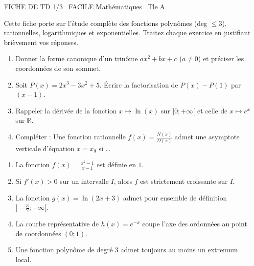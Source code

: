 \documentclass[11pt]{article}
\begin{document}
\begin{tcolorbox}[enhanced,colback=popink,colframe=popink,arc=10pt,boxrule=0pt,left=12pt,right=12pt,top=9pt,bottom=9pt]
{\color{white}\popxbold\small FICHE DE TD 1/3 \textbullet\ FACILE \hfill Mathématiques \textbullet\ Tle A\par}
\end{tcolorbox}
\vspace{4pt}
Cette fiche porte sur l'étude complète des fonctions polynômes (deg $\le 3$), rationnelles, logarithmiques et exponentielles. Traitez chaque exercice en justifiant brièvement vos réponses.

\begin{exercice}
\begin{enumerate}
    \item Donner la forme canonique d'un trinôme $ax^2+bx+c$ ($a \neq 0$) et préciser les coordonnées de son sommet.
    \item Soit $P(x)=2x^3-3x^2+5$. Écrire la factorisation de $P(x)-P(1)$ par $(x-1)$.
    \item Rappeler la dérivée de la fonction $x \mapsto \ln(x)$ sur $]0;+\infty[$ et celle de $x \mapsto e^x$ sur $\mathbb{R}$.
    \item Compléter : Une fonction rationnelle $f(x)=\frac{N(x)}{D(x)}$ admet une asymptote verticale d'équation $x=x_0$ si \ldots
\end{enumerate}
\end{exercice}

\begin{exercice}
\begin{enumerate}
    \item La fonction $f(x)=\frac{x^2-1}{x-1}$ est définie en $1$.
    \item Si $f'(x) > 0$ sur un intervalle $I$, alors $f$ est strictement croissante sur $I$.
    \item La fonction $g(x)=\ln(2x+3)$ admet pour ensemble de définition $]-\frac{3}{2}; +\infty[$.
    \item La courbe représentative de $h(x)=e^{-x}$ coupe l'axe des ordonnées au point de coordonnées $(0;1)$.
    \item Une fonction polynôme de degré 3 admet toujours au moins un extremum local.
\end{enumerate}
\end{exercice}
\end{document}
